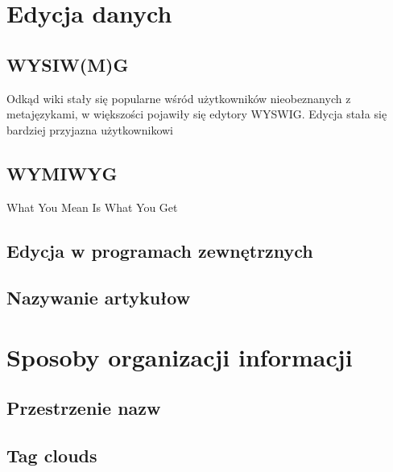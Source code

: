 \documentclass{article}
\begin{document}
\section{Edycja danych}
	\subsection{WYSIW(M)G}
	Odkąd wiki stały się popularne wśród użytkowników nieobeznanych z metajęzykami, 
w większości pojawiły się edytory WYSWIG. Edycja stała się bardziej przyjazna użytkownikowi

	\subsection{WYMIWYG}
What You Mean Is What You Get

	\subsection{Edycja w programach zewnętrznych}


	\subsection{Nazywanie artykułow}

\section{Sposoby organizacji informacji}	
	\subsection{Przestrzenie nazw}
	\subsection{Tag clouds}
\end{document}
